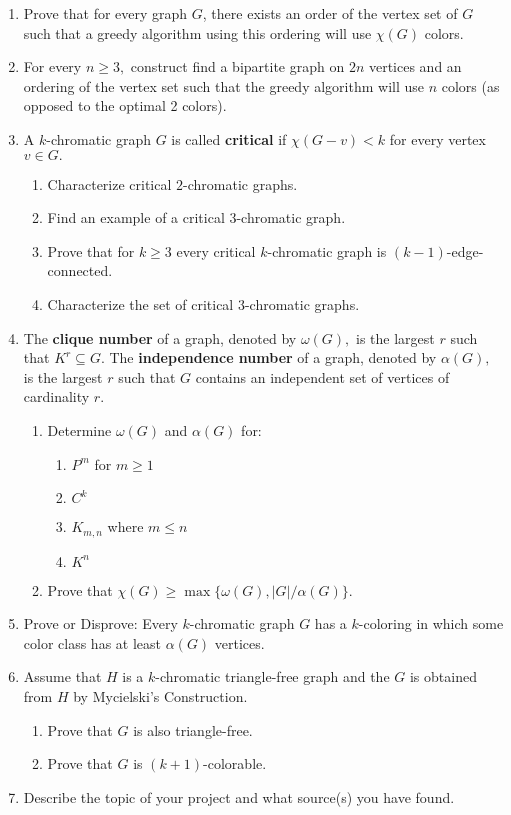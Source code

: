 \documentclass[12pt]{article}
\renewcommand{\emph}[1]{\textsf{\textbf{#1}}}
\begin{document}
\begin{enumerate}
	\item Prove that for every graph $G$, there exists an order of the vertex set of $G$ such that a greedy algorithm using this ordering will use $\chi(G)$ colors.
	\item For every $n \geq 3,$ construct find a bipartite graph on $2n$ vertices and an ordering of the vertex set such that the greedy algorithm will use $n$ colors (as opposed to the optimal 2 colors).
	\item A $k$-chromatic graph $G$ is called \emph{critical} if $\chi(G-v) < k$ for every vertex $v \in G.$
	\begin{enumerate}
	\item Characterize critical $2$-chromatic graphs.
	\item Find an example of a critical $3$-chromatic graph.
	\item Prove that for $k\geq 3$ every critical $k$-chromatic graph is $(k-1)$-edge-connected.
	\item Characterize the set of critical $3$-chromatic graphs.
	\end{enumerate}
	\item The \emph{clique number} of a graph, denoted by $\omega(G),$ is the largest $r$ such that $K^r \subseteq G.$ The \emph{independence number} of a graph, denoted by $\alpha(G),$ is the largest $r$ such that $G$ contains an independent set of vertices of cardinality $r.$
	\begin{enumerate}
	\item Determine $\omega(G)$ and $\alpha(G)$ for:
		\begin{enumerate}
		\item $P^m$ for $m\geq 1$
		\item $C^k$
		\item $K_{m,n}$ where $m \leq n$
		\item $K^n$
		\end{enumerate}
	\item Prove that $\chi(G) \geq \max\{ \omega(G), |G|/\alpha(G)\}.$
	\end{enumerate}
	\item Prove or Disprove: Every $k$-chromatic graph $G$ has a $k$-coloring in which some color class has at least $\alpha(G)$ vertices.
	\item Assume that $H$ is a $k$-chromatic triangle-free graph and the $G$ is obtained from $H$ by Mycielski's Construction.
	\begin{enumerate}
	\item Prove that $G$ is also triangle-free.
	\item Prove that $G$ is $(k+1)$-colorable.
	\end{enumerate}
	\item Describe the topic of your project and what source(s) you have found.
\end{enumerate}
\end{document}

